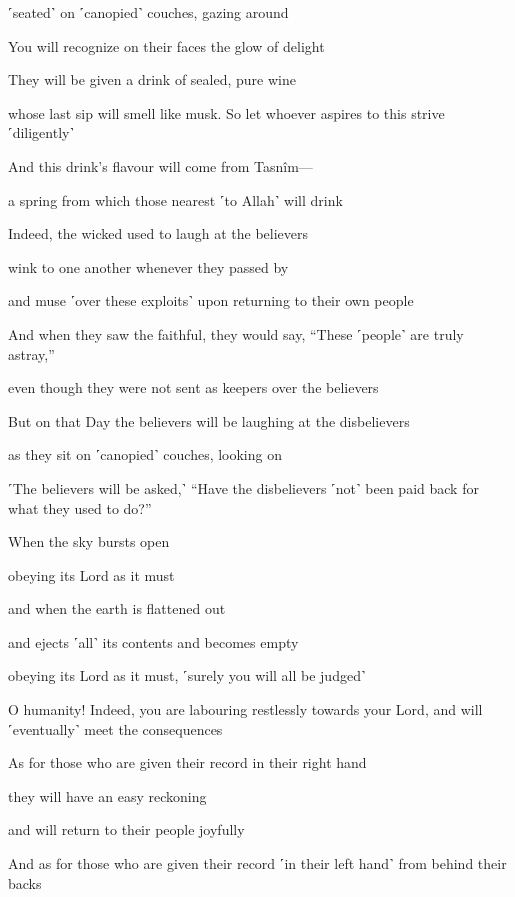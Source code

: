 ˹seated˺ on ˹canopied˺ couches, gazing around

You will recognize on their faces the glow of delight

They will be given a drink of sealed, pure wine

whose last sip will smell like musk. So let whoever aspires to this strive ˹diligently˺

And this drink’s flavour will come from Tasnîm—

a spring from which those nearest ˹to Allah˺ will drink

Indeed, the wicked used to laugh at the believers

wink to one another whenever they passed by

and muse ˹over these exploits˺ upon returning to their own people

And when they saw the faithful, they would say, “These ˹people˺ are truly astray,”

even though they were not sent as keepers over the believers

But on that Day the believers will be laughing at the disbelievers

as they sit on ˹canopied˺ couches, looking on

˹The believers will be asked,˺ “Have the disbelievers ˹not˺ been paid back for what they used to do?”

When the sky bursts open

obeying its Lord as it must

and when the earth is flattened out

and ejects ˹all˺ its contents and becomes empty

obeying its Lord as it must, ˹surely you will all be judged˺

O humanity! Indeed, you are labouring restlessly towards your Lord, and will ˹eventually˺ meet the consequences

As for those who are given their record in their right hand

they will have an easy reckoning

and will return to their people joyfully

And as for those who are given their record ˹in their left hand˺ from behind their backs


